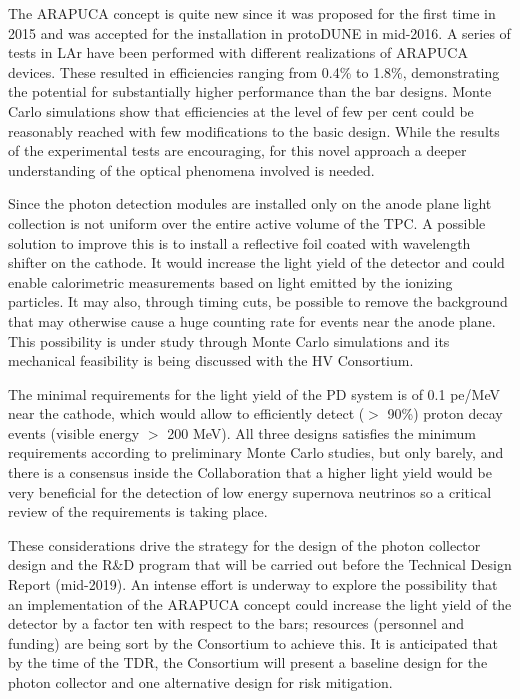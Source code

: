  
The ARAPUCA concept is quite new since it was proposed for the first time in 2015 and was accepted for the installation in protoDUNE in mid-2016. A series of tests in LAr have been performed with different 
realizations of ARAPUCA devices. These resulted in efficiencies ranging from 
0.4\% to 1.8\%, demonstrating the potential for substantially higher performance than the bar designs. Monte Carlo simulations show that efficiencies at the level of few per cent could be reasonably reached with few modifications to the basic design. 
While the results of the experimental tests are encouraging, for this novel approach a deeper understanding of the optical phenomena involved is needed.

Since the photon detection modules are installed only on the anode plane light collection is not uniform over the entire active volume of the TPC. A possible solution to improve this is to install a reflective foil coated with wavelength shifter on the cathode.
 It would increase the light yield of the detector and could enable calorimetric measurements based on light emitted by the ionizing particles. It may also, through timing cuts, be possible to remove the  background that may otherwise cause a huge counting rate for events near  the anode plane. This possibility is under study through Monte Carlo simulations and its mechanical
feasibility is being discussed with the HV Consortium.

The minimal requirements for the light yield of the PD system is of 0.1 
pe/MeV near the cathode, which would allow to efficiently  detect ($>$ 90\%) 
proton decay events (visible energy $>$ 200 MeV). All three designs 
satisfies the minimum requirements according to preliminary Monte Carlo 
studies, but only barely, and there is a consensus inside the Collaboration that a higher 
light yield would be very beneficial for the detection of low energy supernova 
neutrinos so a critical review of the requirements is taking place.

These considerations drive the strategy for the design of the photon collector design and the R\&D program that will 
be carried out before the Technical Design Report (mid-2019). An intense effort 
is underway to explore the possibility that an implementation of the ARAPUCA concept could increase the light yield of the 
detector by a factor ten with respect to the bars; resources (personnel and funding) are being sort by the Consortium to achieve this.  
It is anticipated that by the time of the TDR, the Consortium will present a baseline design for the photon collector and one alternative design for risk mitigation.  

